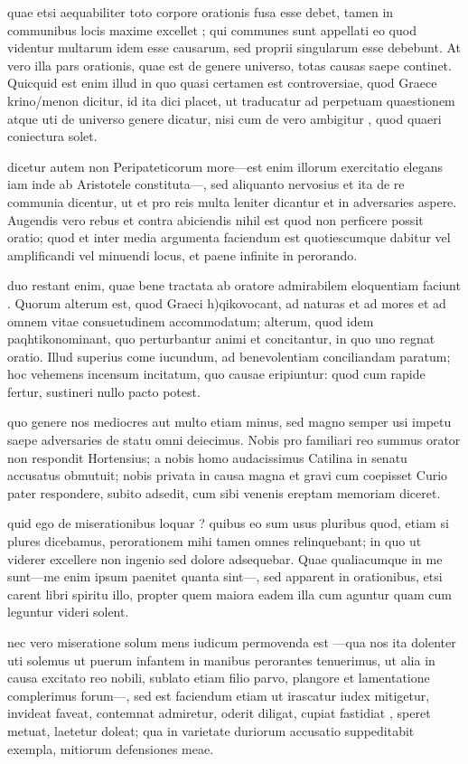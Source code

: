  quae etsi aequabiliter toto corpore orationis fusa esse debet, tamen in communibus locis maxime excellet ; qui communes sunt appellati eo quod videntur multarum idem esse causarum, sed proprii singularum esse debebunt. At vero illa pars orationis, quae est de genere universo, totas causas saepe continet. Quicquid est enim illud in quo quasi certamen est controversiae, quod Graece krino/menon dicitur, id ita dici placet, ut traducatur ad perpetuam quaestionem atque uti de universo genere dicatur, nisi cum de vero ambigitur , quod quaeri coniectura solet.

 dicetur autem non Peripateticorum more—est enim illorum exercitatio elegans iam inde ab Aristotele constituta—, sed aliquanto nervosius et ita de re communia dicentur, ut et pro reis multa leniter dicantur et in adversaries aspere. Augendis vero rebus et contra abiciendis nihil est quod non perficere possit oratio; quod et inter media argumenta faciendum est quotiescumque dabitur vel amplificandi vel minuendi locus, et paene infinite in perorando.

 duo restant enim, quae bene tractata ab oratore admirabilem eloquentiam faciunt . Quorum alterum est, quod Graeci h)qiko\n vocant, ad naturas et ad mores et ad omnem vitae consuetudinem accommodatum; alterum, quod idem paqhtiko\n nominant, quo perturbantur animi et concitantur, in quo uno regnat oratio. Illud superius come iucundum, ad benevolentiam conciliandam paratum; hoc vehemens incensum incitatum, quo causae eripiuntur: quod cum rapide fertur, sustineri nullo pacto potest.

 quo genere nos mediocres aut multo etiam minus, sed magno semper usi impetu saepe adversaries de statu omni deiecimus. Nobis pro familiari reo summus orator non respondit Hortensius; a nobis homo audacissimus Catilina in senatu accusatus obmutuit; nobis privata in causa magna et gravi cum coepisset Curio pater respondere, subito adsedit, cum sibi venenis ereptam memoriam diceret.

 quid ego de miserationibus loquar ? quibus eo sum usus pluribus quod, etiam si plures dicebamus, perorationem mihi tamen omnes relinquebant; in quo ut viderer excellere non ingenio sed dolore adsequebar. Quae qualiacumque in me sunt—me enim ipsum paenitet quanta sint—, sed apparent in orationibus, etsi carent libri spiritu illo, propter quem maiora eadem illa cum aguntur quam cum leguntur videri solent.

 nec vero miseratione solum mens iudicum permovenda est —qua nos ita dolenter uti solemus ut puerum infantem in manibus perorantes tenuerimus, ut alia in causa excitato reo nobili, sublato etiam filio parvo, plangore et lamentatione complerimus forum—, sed est faciendum etiam ut irascatur iudex mitigetur, invideat faveat, contemnat admiretur, oderit diligat, cupiat fastidiat , speret metuat, laetetur doleat; qua in varietate duriorum accusatio suppeditabit exempla, mitiorum defensiones meae.

